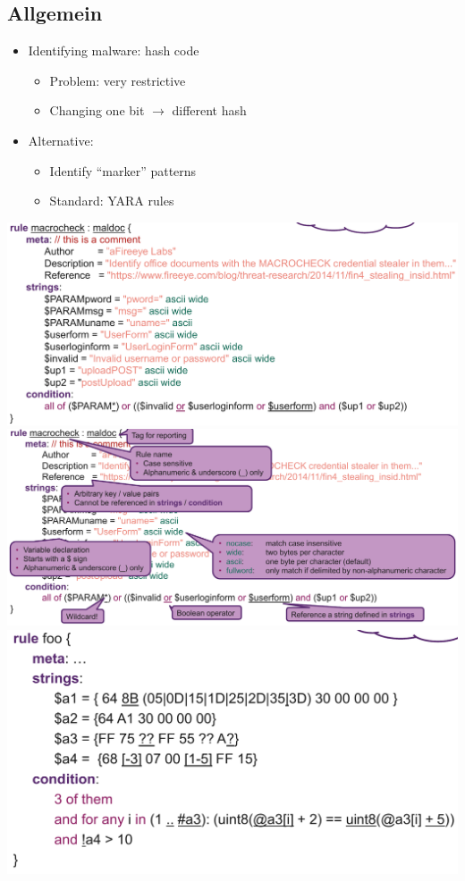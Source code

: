 \subsection{Allgemein}
\begin{itemize}
    \item Identifying malware: hash code
    \begin{itemize}
        \item Problem: very restrictive
        \item Changing one bit $\rightarrow$ different hash
    \end{itemize}
    \item Alternative:
    \begin{itemize}
        \item Identify “marker” patterns
        \item Standard: YARA rules
    \end{itemize}    
\end{itemize}
\includegraphics[width=\linewidth]{./img/13-yara/yara_rule.png}
\includegraphics[width=\linewidth]{./img/13-yara/yara_rule_explained.png}
\includegraphics[width=\linewidth]{./img/13-yara/yara_rule2.png}
